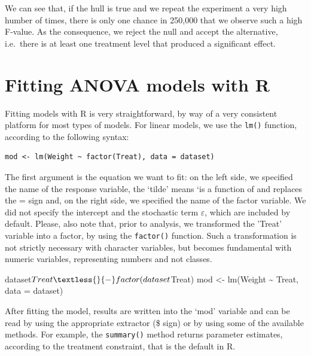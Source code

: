 \documentclass[a4paper,12pt,oneside]{book}
\newenvironment{Shaded}{\begin{snugshade}}{\end{snugshade}}
\newcommand{\SpecialCharTok}[1]{#1}
\newcommand{\OtherTok}[1]{#1}
\newcommand{\FunctionTok}[1]{#1}
\newcommand{\AttributeTok}[1]{#1}
\newcommand{\NormalTok}[1]{#1}
\begin{document}
We can see that, if the hull is true and we repeat the experiment a very high humber of times, there is only one chance in 250,000 that we observe such a high F-value. As the consequence, we reject the null and accept the alternative, i.e.~there is at least one treatment level that produced a significant effect.

\hypertarget{fitting-anova-models-with-r}{%
\section{Fitting ANOVA models with R}\label{fitting-anova-models-with-r}}

Fitting models with R is very straightforward, by way of a very consistent platform for most types of models. For linear models, we use the \texttt{lm()} function, according to the following syntax:

\begin{verbatim}
mod <- lm(Weight ~ factor(Treat), data = dataset)
\end{verbatim}

The first argument is the equation we want to fit: on the left side, we specified the name of the response variable, the `tilde' means `is a function of and replaces the = sign and, on the right side, we specified the name of the factor variable. We did not specify the intercept and the stochastic term \(\varepsilon\), which are included by default. Please, also note that, prior to analysis, we transformed the 'Treat' variable into a factor, by using the \texttt{factor()} function. Such a transformation is not strictly necessary with character variables, but becomes fundamental with numeric variables, representing numbers and not classes.

\vspace{12pt}

\begin{Shaded}
\begin{Highlighting}[]
\NormalTok{dataset}\SpecialCharTok{$}\NormalTok{Treat }\OtherTok{\textless{}{-}} \FunctionTok{factor}\NormalTok{(dataset}\SpecialCharTok{$}\NormalTok{Treat)}
\NormalTok{mod }\OtherTok{\textless{}{-}} \FunctionTok{lm}\NormalTok{(Weight }\SpecialCharTok{\textasciitilde{}}\NormalTok{ Treat, }\AttributeTok{data =}\NormalTok{ dataset)}
\end{Highlighting}
\end{Shaded}

After fitting the model, results are written into the `mod' variable and can be read by using the appropriate extractor (\$ sign) or by using some of the available methods. For example, the \texttt{summary()} method returns parameter estimates, according to the treatment constraint, that is the default in R.
\end{document}
